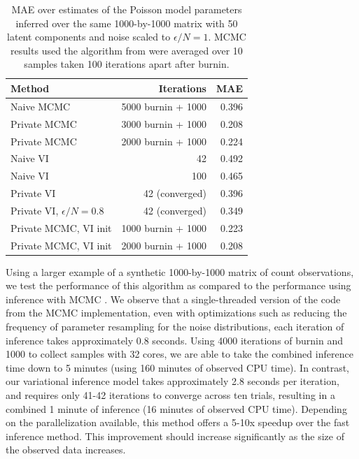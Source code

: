\documentclass[letterpaper]{article}
\begin{document}
  \begin{table}[h]
    \center
    \small
    \begin{tabular}{|l|r|r|}
      \hline
      Method & Iterations & MAE \\
      \hline
      Naive MCMC & 5000 burnin + 1000 & 0.396 \\
      Private MCMC & 3000 burnin + 1000 & 0.208 \\
      Private MCMC & 2000 burnin + 1000 & 0.224 \\
      \hline 
      Naive VI & 42 & 0.492 \\
      Naive VI & 100 & 0.465 \\
      Private VI & 42 (converged) & 0.396 \\
      Private VI, $\epsilon/N = 0.8$ & 42 (converged) & 0.349 \\
      \hline
      Private MCMC, VI init & 1000 burnin + 1000 & 0.223 \\
      Private MCMC, VI init & 2000 burnin + 1000 & 0.208 \\
      \hline
    \end{tabular}
    \caption{MAE over estimates of the Poisson model parameters inferred over the
    same 1000-by-1000 matrix with 50 latent components and noise scaled to $\epsilon/N = 1$. MCMC results used the algorithm from \cite{schein2018locally} were averaged over 10 samples taken 100 iterations apart after burnin.}
    \label{tab:results_synth}
  \end{table}

  Using a larger example of a synthetic 1000-by-1000 matrix of count
  observations, we test the performance of this algorithm as compared to the
  performance using inference with MCMC \citep{schein2018locally}. We observe
  that a single-threaded version of the code from the MCMC implementation, even
  with optimizations such as reducing the frequency of parameter resampling for
  the noise distributions, each iteration of inference takes approximately 0.8
  seconds. Using 4000 iterations of burnin and 1000 to collect samples with 32
  cores, we are able to take the combined inference time down to 5 minutes
  (using 160 minutes of observed CPU time). In contrast, our variational
  inference model takes approximately 2.8 seconds per iteration, and requires
  only 41-42 iterations to converge across ten trials, resulting in a combined 1
  minute of inference (16 minutes of observed CPU time). Depending on the
  parallelization available, this method offers a 5-10x speedup over the fast
  inference method. This improvement should increase significantly as the size
  of the observed data increases.
\end{document}
